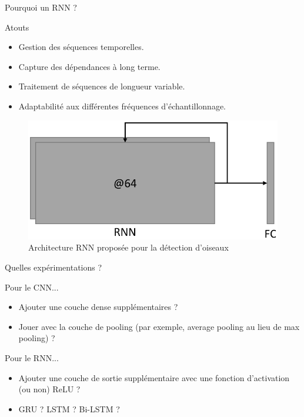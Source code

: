 \documentclass[compress,xcolor=table]{beamer}
\begin{document}
\begin{frame}{Pourquoi un RNN ?}

    \begin{block}{Atouts}
        \begin{itemize}
            \item Gestion des séquences temporelles.
            \item Capture des dépendances à long terme.
            \item Traitement de séquences de longueur variable.
            \item Adaptabilité aux différentes fréquences d'échantillonnage.
        \end{itemize}
    \end{block}

    \begin{figure}
        \includegraphics[height=0.35\textheight,keepaspectratio]{../images/models/RNN.architecture.pdf}
        \caption{Architecture RNN proposée pour la détection d'oiseaux}
        \label{fig:RNN.architecture.birds}
    \end{figure}

\end{frame}

\begin{frame}{Quelles expérimentations ?}
    
    \begin{block}{Pour le CNN...}
        \begin{itemize}
            \item Ajouter une couche dense supplémentaires ?
            \item Jouer avec la couche de pooling (par exemple, average pooling au lieu de max pooling) ?
        \end{itemize}
    \end{block}

    \begin{block}{Pour le RNN...}
        \begin{itemize}
            \item Ajouter une couche de sortie supplémentaire avec une fonction d'activation (ou non) ReLU ?
            \item GRU ? LSTM ? Bi-LSTM ?
        \end{itemize}
    \end{block}

\end{frame}
\end{document}
